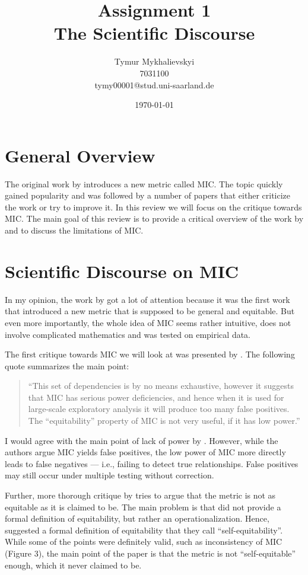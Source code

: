 \documentclass{article}
\title{\vspace{-2cm}Assignment 1\\
    The Scientific Discourse}
\author{Tymur Mykhalievskyi\\ 7031100\\ tymy00001@stud.uni-saarland.de}
\date{\today}
\begin{document}
\maketitle

\section{General Overview}
The original work by \cite{reshef2011} introduces a new metric called MIC. The topic quickly gained popularity and was followed by a number of papers that either criticize the work or try to improve it. In this review we will focus on the critique towards MIC. The main goal of this review is to provide a critical overview of the work by \cite{reshef2011} and to discuss the limitations of MIC. 

\section{Scientific Discourse on MIC}
\label{sec:discourse}
In my opinion, the work by \cite{reshef2011} got a lot of attention because it was the first work that introduced a new metric that is supposed to be general and equitable. But even more importantly, the whole idea of MIC seems rather intuitive, does not involve complicated mathematics and was tested on empirical data. 

The first critique towards MIC we will look at was presented by \cite{simon2014}. The following quote summarizes the main point: 
\begin{quote}
    ``This set of dependencies is by no means exhaustive, however it suggests that MIC has serious power deficiencies, and hence when it is used for large-scale exploratory analysis it will produce too many false positives. The ``equitability'' property of MIC is not very useful, if it has low power.''
\end{quote}

I would agree with the main point of lack of power by \cite{simon2014}. However, while the authors argue MIC yields false positives, the low power of MIC more directly leads to false negatives — i.e., failing to detect true relationships. False positives may still occur under multiple testing without correction.

Further, more thorough critique by \cite{kinney2014} tries to argue that the metric is not as equitable as it is claimed to be. The main problem is that \cite{reshef2011} did not provide a formal definition of equitability, but rather an operationalization. Hence, \cite{kinney2014} suggested a formal definition of equitability that they call ``self-equitability''. While some of the points were definitely valid, such as inconsistency of MIC \citep{kinney2014} (Figure 3), the main point of the paper is that the metric is not ``self-equitable'' enough, which it never claimed to be. 
\end{document}

